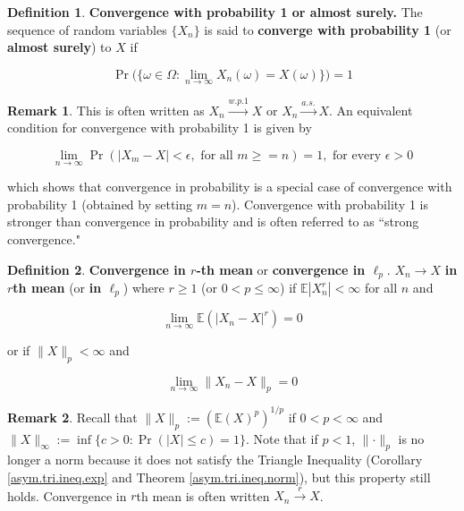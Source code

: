 \documentclass{article}
\newcommand{\E}{\mathbb{E}}
\theoremstyle{definition}
\theoremstyle{definition}
\theoremstyle{definition}
\theoremstyle{definition}
\theoremstyle{definition}
\newtheorem{definition}{Definition}[section]
\newtheorem*{remark}{Remark}
\theoremstyle{definition}
\theoremstyle{definition}
\begin{document}
\begin{definition}
\textbf{Convergence with probability 1 or almost surely.} The sequence of random variables \(\{X_n\}\) is said to \textbf{converge with probability 1} (or \textbf{almost surely}) to \(X\) if 



\[
\Pr\big( \{\omega \in \Omega: \lim_{n \to \infty} X_n(\omega) = X(\omega) \} \big) = 1
\]



\begin{remark}This is often written as \(X_n \xrightarrow{w.p.1} X\) or \(X_n \xrightarrow{a.s.} X\). An equivalent condition for convergence with probability 1 is given by

\[
\lim_{n \to \infty} \Pr( |X_m - X| < \epsilon, \text{ for all } m \geq =n) = 1, \text{ for every } \epsilon > 0
\]

which shows that convergence in probability is a special case of convergence with probability 1 (obtained by setting \(m = n\)). Convergence with probability 1 is stronger than convergence in probability and is often referred to as ``strong convergence." \end{remark}

\end{definition}

\begin{definition}
\textbf{Convergence in \(r\)-th mean} or \textbf{convergence in \(\ell_p\)}. \(X_n \to X\) \textbf{in \(r\)th mean}  (or \textbf{in \(\ell_p\)}) where \(r \geq 1\) (or \(0 < p \leq \infty\)) if \(\E|X_n^r| < \infty\) for all \(n\) and

\[
\lim_{n \to \infty} \E(|X_n - X|^r) = 0
\]

or if \(\lVert X \rVert_p < \infty\) and

\[
\lim_{n \to \infty} \lVert X_n - X \rVert _p = 0
\]

\begin{remark}
Recall that \(\lVert X \rVert_p := (\E(X)^p)^{1/p}\) if \(0 < p < \infty\) and \(\lVert X \rVert_\infty := \inf \{c >0: \Pr(|X| \leq c ) = 1\}\). Note that if \(p < 1\), \(\lVert \cdot \rVert_p\) is no longer a norm because it does not satisfy the Triangle Inequality (Corollary \ref{asym.tri.ineq.exp} and Theorem \ref{asym.tri.ineq.norm}), but this property still holds. Convergence in \(r\)th mean is often written \(X_n \xrightarrow{r} X\).
\end{remark}
\end{definition}
\end{document}
